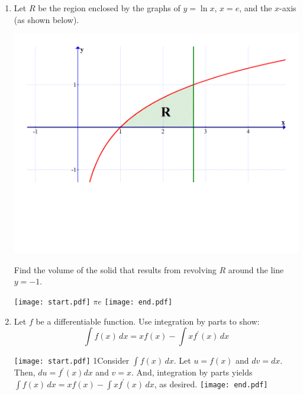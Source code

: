 \documentclass[12pt]{article}
\begin{document}
\begin{enumerate}
\item Let $R$ be the region enclosed by the graphs of $y=\ln{x}$, $x=e$, and the $x$-axis (as shown below).

\begin{center}
\includegraphics[scale=0.4]{volume2.pdf}
\end{center}

 Find the volume of the solid that results from revolving $R$ around the line $y=-1$.

\texttt{[image: start.pdf]}
{{$\pi e$}}
\texttt{[image: end.pdf]}


\item Let $f$ be a differentiable function. Use integration by parts to show: 
$$\int f(x) \,dx=xf(x)-\int x f^{\prime}(x) \,dx$$

\texttt{[image: start.pdf]}
{{{1\linewidth}{Consider $\int f(x) \,dx$.  Let $u=f(x)$ and $dv=dx$.  Then, $du=f^{\prime}(x)dx$ and $v=x$.  And, integration by parts yields $\int f(x) \,dx = xf(x)-\int x f^{\prime}(x) \,dx$, as desired.}}}
\texttt{[image: end.pdf]}


\end{enumerate}
\end{document}
